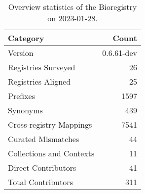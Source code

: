 \begin{table}
\centering
\caption{Overview statistics of the Bioregistry on 2023-01-28.}
\label{tab:bioregistry-summary}
\begin{tabular}{lr}
\toprule
                Category &      Count \\
\midrule
                 Version & 0.6.61-dev \\
     Registries Surveyed &         26 \\
      Registries Aligned &         25 \\
                Prefixes &       1597 \\
                Synonyms &        439 \\
 Cross-registry Mappings &       7541 \\
      Curated Mismatches &         44 \\
Collections and Contexts &         11 \\
     Direct Contributors &         41 \\
      Total Contributors &        311 \\
\bottomrule
\end{tabular}
\end{table}
